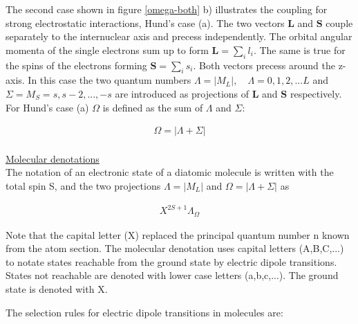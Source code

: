 \documentclass[parskip,12pt,headsepline,a4paper] {scrbook}
\begin{document}
The second case shown in figure \ref{omega-both} b) illustrates the coupling for strong electrostatic interactions, Hund's case (a). The two vectors $\boldsymbol{L}$ and $\boldsymbol{S}$ couple separately to the internuclear axis and precess independently. The orbital angular momenta of the single electrons sum up to form $\mathbf{L} = \sum\limits_{i} l_i$. The same is true for the spins of the electrons forming $\mathbf{S} = \sum\limits_{i} s_i$. Both vectors precess around the z-axis. In this case the two quantum numbers $\Lambda = |M_L|,\quad \Lambda = 0, 1, 2,...L$ and $\Sigma = M_S = s, s-2,...,-s$ are introduced as projections of $\boldsymbol{L}$ and $\boldsymbol{S}$ respectively. For Hund's case (a) $\Omega$ is defined as the sum of $\Lambda$ and $\Sigma$:

\begin{align}  \label{omega-ls}
\Omega = |\Lambda + \Sigma|
\end{align}\\


\underline{Molecular denotations} \\
The notation of an electronic state of a diatomic molecule is written with the total spin S, and the two projections $\Lambda = |M_L|$ and $\Omega = |\Lambda + \Sigma|$ as

\begin{align}  \label{mole-denotation}
X^{2S+1}\Lambda_{\Omega}
\end{align}

Note that the capital letter (X) replaced the principal quantum number n known from the atom section. The molecular denotation uses capital letters (A,B,C,...) to notate states reachable from the ground state by electric dipole transitions. States not reachable are denoted with lower case letters (a,b,c,...). The ground state is denoted with X.

The selection rules for electric dipole transitions in molecules are:
\end{document}
